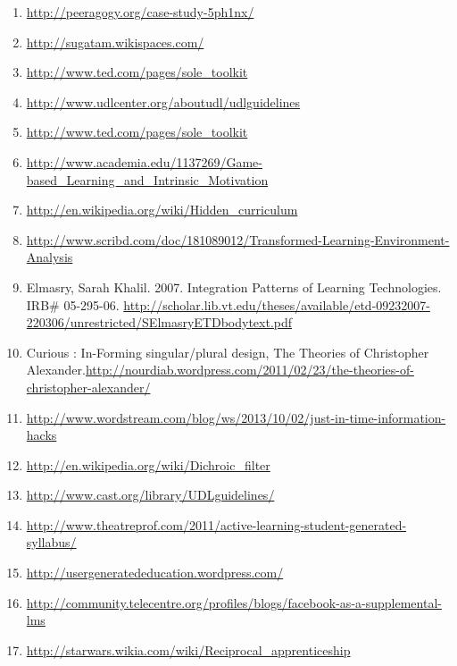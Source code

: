 \begin{enumerate}
\item
  \href{http://peeragogy.org/case-study-5ph1nx/}{http://peeragogy.org/case-study-5ph1nx/}
\item
  \href{http://sugatam.wikispaces.com/}{http://sugatam.wikispaces.com/}
\item
  \href{http://www.ted.com/pages/sole\_toolkit}{http://www.ted.com/pages/sole\_toolkit}
\item
  \href{http://www.udlcenter.org/aboutudl/udlguidelines}{http://www.udlcenter.org/aboutudl/udlguidelines}
\item
  \href{http://www.ted.com/pages/sole\_toolkit}{http://www.ted.com/pages/sole\_toolkit}
\item
  \href{http://www.academia.edu/1137269/Game-based\_Learning\_and\_Intrinsic\_Motivation}{http://www.academia.edu/1137269/Game-based\_Learning\_and\_Intrinsic\_Motivation}
\item
  \href{http://en.wikipedia.org/wiki/Hidden\_curriculum}{http://en.wikipedia.org/wiki/Hidden\_curriculum}
\item
  \href{http://www.scribd.com/doc/181089012/Transformed-Learning-Environment-Analysis}{http://www.scribd.com/doc/181089012/Transformed-Learning-Environment-Analysis}
\item
  Elmasry, Sarah Khalil. 2007. Integration Patterns of Learning
  Technologies. IRB\# 05-295-06.
  \href{http://scholar.lib.vt.edu/theses/available/etd-09232007-220306/unrestricted/SElmasryETDbodytext.pdf}{http://scholar.lib.vt.edu/theses/available/etd-09232007-220306/unrestricted/SElmasryETDbodytext.pdf}
\item
  Curious : In-Forming singular/plural design, The Theories of
  Christopher
  Alexander.\href{http://nourdiab.wordpress.com/2011/02/23/the-theories-of-christopher-alexander/}{http://nourdiab.wordpress.com/2011/02/23/the-theories-of-christopher-alexander/}
\item
  \href{http://www.wordstream.com/blog/ws/2013/10/02/just-in-time-information-hacks}{http://www.wordstream.com/blog/ws/2013/10/02/just-in-time-information-hacks}
\item
  \href{http://en.wikipedia.org/wiki/Dichroic\_filter}{http://en.wikipedia.org/wiki/Dichroic\_filter}
\item
  \href{http://www.cast.org/library/UDLguidelines/}{http://www.cast.org/library/UDLguidelines/}
\item
  \href{http://www.theatreprof.com/2011/active-learning-student-generated-syllabus/}{http://www.theatreprof.com/2011/active-learning-student-generated-syllabus/}
\item
  \href{http://usergeneratededucation.wordpress.com/}{http://usergeneratededucation.wordpress.com/}
\item
  \href{http://community.telecentre.org/profiles/blogs/facebook-as-a-supplemental-lms}{http://community.telecentre.org/profiles/blogs/facebook-as-a-supplemental-lms}
\item
  \href{http://starwars.wikia.com/wiki/Reciprocal\_apprenticeship}{http://starwars.wikia.com/wiki/Reciprocal\_apprenticeship}
\end{enumerate}

